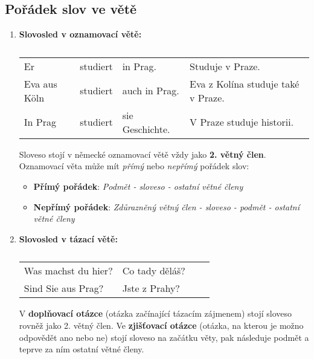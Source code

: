   \subsection*{Pořádek slov ve větě}  %
    \begin{enumerate}
       \item \textbf{Slovosled v oznamovací větě:}
             \begin{table}[ht!]   
               \hspace*{2em}
               \begin{tabular}{llll}
                 Er           & studiert & in Prag.        & Studuje v Praze.                  \\
                 Eva aus Köln & studiert & auch in Prag.   & Eva z Kolína studuje také v Praze.\\
                 In Prag      & studiert & sie Geschichte. & V Praze studuje historii.         \\
               \end{tabular}
               \caption*{ }
             \end{table}
             
            Sloveso stojí v německé oznamovací větě vždy jako \textbf{2. větný člen}. Oznamovací 
            věta může mít \emph{přímý} nebo \emph{nepřímý} pořádek slov:
            \begin{itemize}
             \item \textbf{Přímý pořádek}:\newline
                   \emph{Podmět - sloveso - ostatní větné členy}
             \item \textbf{Nepřímý pořádek}:\newline
                   \emph{Zdůrazněný větný člen - sloveso - podmět - ostatní větné členy} 
          \end{itemize}
      \item \textbf{Slovosled v tázací větě:}
        \begin{table}[ht!] 
          \hspace*{2em} 
          \begin{tabular}{llll}
            Was machst du hier?  & Co tady děláš? \\
            Sind Sie aus Prag?   & Jste z Prahy?  \\
          \end{tabular}
          \caption*{ }
        \end{table}
         
         V \textbf{doplňovací otázce} (otázka začínající tázacím zájmenem) stojí sloveso 
         rovněž jako 2. větný člen. Ve \textbf{zjišťovací otázce} (otázka, na kterou je možno 
         odpovědět ano nebo ne) stojí sloveso na začátku věty, pak následuje podmět a teprve za ním 
         ostatní větné členy.
    \end{enumerate}
  
